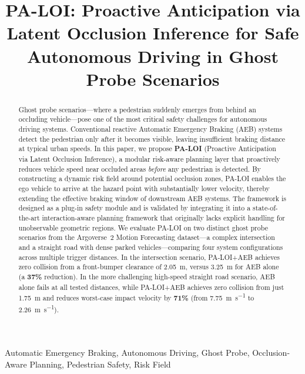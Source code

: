 \documentclass[conference]{IEEEtran}
\title{PA-LOI: Proactive Anticipation via Latent Occlusion Inference for Safe Autonomous Driving in Ghost Probe Scenarios}
\begin{document}
\maketitle

\begin{abstract}
Ghost probe scenarios---where a pedestrian suddenly emerges from behind an occluding vehicle---pose one of the most critical safety challenges for autonomous driving systems.
Conventional reactive Automatic Emergency Braking (AEB) systems detect the pedestrian only after it becomes visible, leaving insufficient braking distance at typical urban speeds.
In this paper, we propose \textbf{PA-LOI} (Proactive Anticipation via Latent Occlusion Inference), a modular risk-aware planning layer that proactively reduces vehicle speed near occluded areas \emph{before} any pedestrian is detected.
By constructing a dynamic risk field around potential occlusion zones, PA-LOI enables the ego vehicle to arrive at the hazard point with substantially lower velocity, thereby extending the effective braking window of downstream AEB systems. The framework is designed as a plug-in safety module and is validated by integrating it into a state-of-the-art interaction-aware planning framework that originally lacks explicit handling for unobservable geometric regions.
We evaluate PA-LOI on two distinct ghost probe scenarios from the Argoverse~2 Motion Forecasting dataset---a complex intersection and a straight road with dense parked vehicles---comparing four system configurations across multiple trigger distances.
In the intersection scenario, PA-LOI+AEB achieves zero collision from a front-bumper clearance of \SI{2.05}{\meter}, versus \SI{3.25}{\meter} for AEB alone (a \textbf{37\%} reduction). In the more challenging high-speed straight road scenario, AEB alone fails at all tested distances, while PA-LOI+AEB achieves zero collision from just \SI{1.75}{\meter} and reduces worst-case impact velocity by \textbf{71\%} (from \SI{7.75}{\meter\per\second} to \SI{2.26}{\meter\per\second}).
\end{abstract}

\begin{IEEEkeywords}
Automatic Emergency Braking, Autonomous Driving, Ghost Probe, Occlusion-Aware Planning, Pedestrian Safety, Risk Field
\end{IEEEkeywords}

\end{document}
